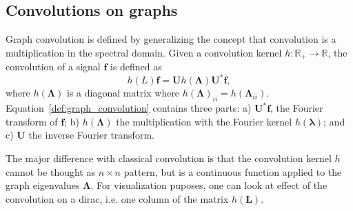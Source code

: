 \documentclass[final,twocolumn,3p,times,authoryear]{elsarticle}
\newcommand{\nati}[1]{{\color[rgb]{.1,.6,.1}{#1}}}
\newcommand{\todo}[1]{{\color[rgb]{.6,.1,.6}{#1}}}
\newcommand{\assign}[1]{{\color[rgb]{.8,.5,.8}{Assigned: #1 }}}
\renewcommand{\b}[1]{{\bm{#1}}}   %
\newcommand{\1}{\b{1}}              %
\newcommand{\0}{\b{0}}              %
\renewcommand{\L}{\b{L}} %
\newcommand{\U}{\b{U}}
\newcommand{\bLambda}{\b{\Lambda}}
\newcommand{\blambda}{\b{\lambda}}
\begin{document}
\subsection{Convolutions on graphs}
\assign{Nathanaël, Michaël} \todo{Add a few extra references}

Graph convolution is defined by generalizing the concept that convolution is a
multiplication in the spectral domain. Given a convolution kernel 
$h:\mathbb{R}_+\rightarrow\mathbb{R}$, the convolution of a signal $\b{f}$ 
is defined as
\begin{equation} \label{def:graph_convolution}
h(L)\b{f} = \U h(\bLambda) \U^* \b{f},
\end{equation}
where $h(\bLambda)$ is a diagonal matrix where $h(\bLambda)_{ii}=h(\bLambda_{ii})$.
Equation~\ref{def:graph_convolution} contains three parts: a) $\U^* \b{f}$, the 
Fourier transform of $\b{f}$; b) $h(\bLambda)$ the multiplication with the Fourier 
kernel $h(\blambda)$; and c) $\U$ the inverse Fourier transform.

The major difference with classical convolution is that the convolution kernel
$h$ cannot be thought as $n \times n$ pattern, but is a continuous function
applied to the graph eigenvalues $\bLambda$. For visualization puposes, one can
look at effect of the convolution on a dirac, i.e. one column of the matrix
$h(\L)$. \nati{However, due to the non regularity of the graph (i.e. the fact
that there is not perfect sampling on the sphere), this visualization will
differ from one node to another. In the specific case of the full sphere, these
difference are negligible in most of the cases. When considering only subpart of
the sphere, one will observe important border effects.}
\end{document}
